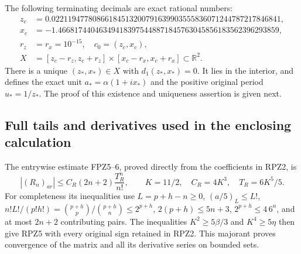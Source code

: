 The following terminating decimals are exact rational numbers:
\[
 \begin{aligned}
 z_c&=0.02211947780866184513200791639903555836071244787217846841,\\
 x_c&=-1.466817440463494183975448871845763045856183562396293859,\\
 r_z&=r_x=10^{-15},\quad c_0=(z_c,x_c),\\
 X&=[z_c-r_z,z_c+r_z]\times[x_c-r_x,x_c+r_x]\subset\mathbb R^2 .
 \end{aligned}\tag{RPZ4}
\]
There is a unique $(z_*,x_*)\in X$ with $d_1(z_*,x_*)=0$.
It lies in the interior, and defines the exact unit
$a_*=\alpha(1+ix_*)$ and the positive original period $u_*=1/z_*$.
The proof of this existence and uniqueness assertion is given next.

\subsection{Full tails and derivatives used in the enclosing calculation}
The entrywise estimate FPZ5--6, proved directly from the coefficients
in RPZ2, is
\[
 |(R_n)_{ar}|\le C_R(2n+2)\frac{T_R^n}{n!},\qquad
 K=11/2,\quad C_R=4K^3,\quad T_R=6K^5/5 .\tag{RPZ5}
\]
For completeness its inequalities use $L=p+h-n\ge0$,
$(a/5)_L\le L!$,
$n!L!/(p!h!)=\binom{p+h}{p}/\binom{p+h}{n}\le2^{p+h}$,
$2(p+h)\le5n+3$, $2^{p+h}\le4\,6^n$, and at most $2n+2$
contributing pairs. The inequalities $K^2\ge5\beta/3$ and
$K^4\ge5\eta$ then give RPZ5 with every original sign retained
in RPZ2. This majorant proves convergence of the matrix and all
its derivative series on bounded sets.

